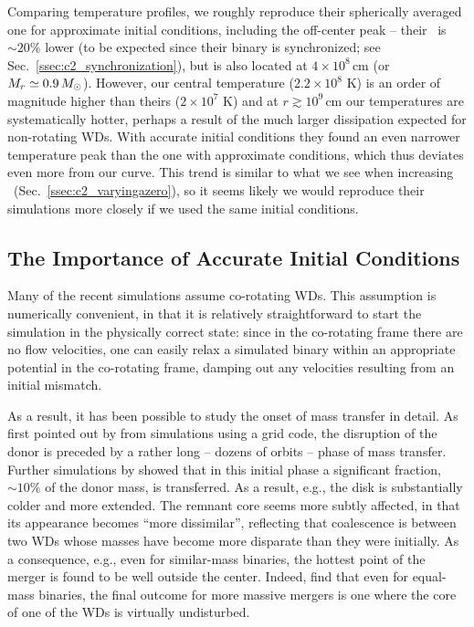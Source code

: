 Comparing temperature profiles, we roughly reproduce their spherically averaged one for approximate initial conditions, including the off-center peak -- their \Tmax\ is $\sim\!20\%$ lower (to be expected since their binary is synchronized; see Sec.~\ref{ssec:c2_synchronization}), but is also located at $4\times10^8\,$cm (or $M_r\simeq0.9\,\Msun$).  However, our central temperature ($2.2\times10^8$ K) is an order of magnitude higher than theirs ($2\times10^7$ K) and at $r\gtrsim10^9\,$cm our temperatures are systematically hotter, perhaps a result of the much larger dissipation expected for non-rotating WDs.  With accurate initial conditions they found an even narrower temperature peak than the one with approximate conditions, which thus deviates even more from our curve.  This trend is similar to what we see when increasing \azero\ (Sec.~\ref{ssec:c2_varyingazero}), so it seems likely we would reproduce their simulations more closely if we used the same initial conditions.

\subsection{The Importance of Accurate Initial Conditions}

Many of the recent simulations \citep{dan+11,dan+12,rask+12} assume co-rotating WDs.  This assumption is numerically convenient, in that it is relatively straightforward to start the simulation in the physically correct state: since in the co-rotating frame there are no flow velocities, one can easily relax a simulated binary within an appropriate potential in the co-rotating frame, damping out any velocities resulting from an initial mismatch.  

As a result, it has been possible to study the onset of mass transfer in detail.  As first pointed out by \citet{dsou+06} from simulations using a grid code, the disruption of the donor is preceded by a rather long -- dozens of orbits -- phase of mass transfer.  Further simulations by \cite{dan+11,dan+12} showed that in this initial phase a significant fraction, $\sim10\%$ of the donor mass, is transferred.  As a result, e.g., the disk is substantially colder and more extended.  The remnant core seems more subtly affected, in that its appearance becomes ``more dissimilar'', reflecting that coalescence is between two WDs whose masses have become more disparate than they were initially.  As a consequence, e.g., even for similar-mass binaries, the hottest point of the merger is found to be well outside the center.  Indeed, \citet{rask+12} find that even for equal-mass binaries, the final outcome for more massive mergers is one where the core of one of the WDs is virtually undisturbed.

